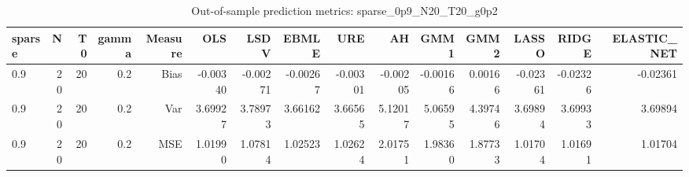 \begin{table}[!htbp]\centering
\caption{Out-of-sample prediction metrics: sparse_0p9_N20_T20_g0p2}
\label{tab:table3_sparse_0p9_N20_T20_g0p2}
\begin{tabular}{lrrrrrrrrrrrrrr}
\hline
sparse & N & T0 & gamma & Measure & OLS & LSDV & EBMLE & URE & AH & GMM1 & GMM2 & LASSO & RIDGE & ELASTIC_NET \\
\hline
0.9 & 20 & 20 & 0.2 & Bias & -0.00340 & -0.00271 & -0.00267 & -0.00301 & -0.00205 & -0.00166 & 0.00166 & -0.02361 & -0.02326 & -0.02361 \\
0.9 & 20 & 20 & 0.2 & Var & 3.69927 & 3.78973 & 3.66162 & 3.66565 & 5.12017 & 5.06595 & 4.39746 & 3.69894 & 3.69933 & 3.69894 \\
0.9 & 20 & 20 & 0.2 & MSE & 1.01990 & 1.07814 & 1.02523 & 1.02624 & 2.01751 & 1.98360 & 1.87733 & 1.01704 & 1.01691 & 1.01704 \\
\hline
\end{tabular}
\end{table}

